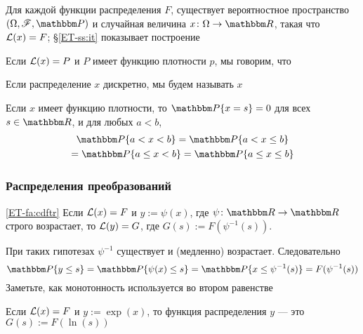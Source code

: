 \begin{frame}

    \vspace{2em}
    Для каждой функции распределения $F$, существует вероятностное пространство 
    $(\Omega, \fF, \PP)$ и случайная величина $x \colon \Omega \to \RR$, 
    такая что $\mathcal L(x) = F$;  \S\ref{ET-ss:it} показывает построение
    
\end{frame}

\begin{frame}
    
    \vspace{2em}
    Если $\mathcal L(x) = P$ и $P$ имеет функцию плотности $p$, мы говорим, что
    
    Если распределение $x$ дискретно, мы будем называть
    $x$ 
    
    \vspace{1em}
    \Fact
    Если $x$ имеет функцию плотности, то $\PP\{x=s\}=0$ для всех $s \in \RR$, и для
    любых $a < b$,
    \begin{multline*}
        \PP\{a < x < b\}
        = \PP\{a < x \leq b\}
        \\ = \PP\{a \leq x < b\}
        = \PP\{a \leq x \leq b\}
    \end{multline*}
\end{frame}

\begin{frame}\frametitle{Распределения преобразований}

    \vspace{2em}
    \Fact\eqref{ET-fa:cdftr}
    Если $\mathcal L(x) = F$ и $y := \psi(x)$, где $\psi \colon \RR \to \RR$ 
    строго возрастает, то $\mathcal L(y)= G$, где $G(s) := F(\psi^{-1}(s))$.
    
    \Prf
    При таких гипотезах $\psi^{-1}$ существует и
    (медленно) возрастает. Следовательно 
    \begin{equation*}
        \PP\{y \leq s\} 
        = \PP\{\psi(x) \leq s\} 
        = \PP\{x \leq \psi^{-1}(s) \} 
        = F( \psi^{-1}(s) )
    \end{equation*}
    Заметьте, как монотонность используется во втором равенстве

\end{frame}

\begin{frame}

    \vspace{2em}
    \Eg
    Если $\mathcal L(x) = F$ и $y := \exp(x)$, то функция распределения $y$ --- это 
    $G(s) := F(\ln(s))$
    
\end{frame}

